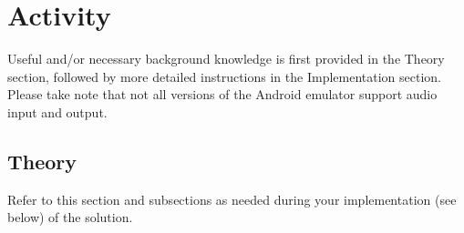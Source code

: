 \section{Activity}
Useful and/or necessary background knowledge is first provided in the Theory section, followed by more detailed instructions in the Implementation section.
Please take note that not all versions of the Android emulator support audio input and output.

\subsection{Theory}
Refer to this section and subsections as needed during your implementation (see below) of the solution.

